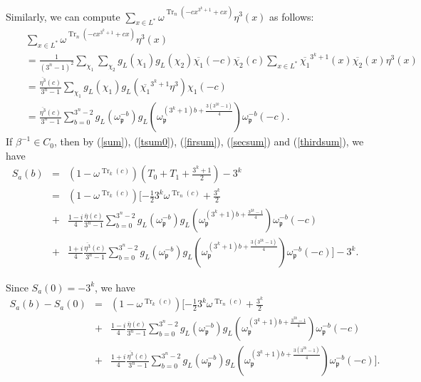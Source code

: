 \documentclass[11pt, reqno]{amsart}
\def\Tr{\operatorname{Tr}}
\def\Tr{\operatorname{Tr}}
\begin{document}
Similarly, we can compute $\sum_{x \in
L^*}\omega^{\Tr_n(-cx^{3^k+1}+cx)}\eta^3(x)$ as follows:
\begin{eqnarray}
&&\sum_{x \in L^*}\omega^{\Tr_n(-cx^{3^k+1}+cx)}\eta^3(x) \nonumber \\
&&=\frac{1}{(3^n-1)^2}\sum_{\chi_1}\sum_{\chi_2}g_L(\chi_1)g_L(\chi_2)\overline{\chi_1}(-c)\overline{\chi_2}(c)
\sum_{x \in L^*}\overline{\chi_1}^{3^k+1}(x)\overline{\chi_2}(x)\eta^3(x) \nonumber\\
&&=\frac{\overline{\eta^3}(c)}{3^n-1}\sum_{\chi_1}g_L(\chi_1)g_L(\overline{\chi_1}^{3^k+1}\eta^3)\chi_1(-c) \nonumber \\
&&=\frac{\overline{\eta^3}(c)}{3^n-1}\sum_{b=0}^{3^n-2}g_L(\omega_{\mathfrak{p}}^{-b})g_L(\omega_{\mathfrak{p}}^{(3^k+1)b+\frac{3(3^{2k}-1)}{4}})\omega_{\mathfrak{p}}^{-b}(-c).
\label{thirdsum}
\end{eqnarray}
If $\beta^{-1} \in C_0$, then by (\ref{sum}), (\ref{tsum0}),
(\ref{firsum}), (\ref{secsum}) and (\ref{thirdsum}), we have
\begin{eqnarray}
S_a(b)&=&(1-\omega^{\Tr_k(c)})(T_0+T_1+\frac{3^k+1}{2})-3^k \nonumber\\
&=&(1-\omega^{\Tr_k(c)})[-\frac{1}{2}3^k\omega^{\Tr_n(c)}+\frac{3^k}{2} \nonumber\\
&+&\frac{1-i}{4}\frac{\overline{\eta}(c)}{3^n-1}\sum_{b=0}^{3^n-2}g_L(\omega_{\mathfrak{p}}^{-b})g_L(\omega_{\mathfrak{p}}^{(3^k+1)b+\frac{3^{2k}-1}{4}})\omega_{\mathfrak{p}}^{-b}(-c) \nonumber\\
&+&\frac{1+i}{4}\frac{\overline{\eta^3}(c)}{3^n-1}\sum_{b=0}^{3^n-2}g_L(\omega_{\mathfrak{p}}^{-b})g_L(\omega_{\mathfrak{p}}^{(3^k+1)b+\frac{3(3^{2k}-1)}{4}})\omega_{\mathfrak{p}}^{-b}(-c)]-3^k.
\end{eqnarray} \label{walshform}

Since $S_a(0)=-3^k$, we have
\begin{eqnarray}
S_a(b)-S_a(0)&=&(1-\omega^{\Tr_k(c)})[-\frac{1}{2}3^k\omega^{\Tr_n(c)}+\frac{3^k}{2}\nonumber \\
&+&\frac{1-i}{4}\frac{\overline{\eta}(c)}{3^n-1}\sum_{b=0}^{3^n-2}g_L(\omega_{\mathfrak{p}}^{-b})g_L(\omega_{\mathfrak{p}}^{(3^k+1)b+\frac{3^{2k}-1}{4}})\omega_{\mathfrak{p}}^{-b}(-c)\nonumber \\
&+&\frac{1+i}{4}\frac{\overline{\eta^3}(c)}{3^n-1}\sum_{b=0}^{3^n-2}g_L(\omega_{\mathfrak{p}}^{-b})g_L(\omega_{\mathfrak{p}}^{(3^k+1)b+\frac{3(3^{2k}-1)}{4}})\omega_{\mathfrak{p}}^{-b}(-c)].\label{diff0}
\end{eqnarray}
\end{document}
